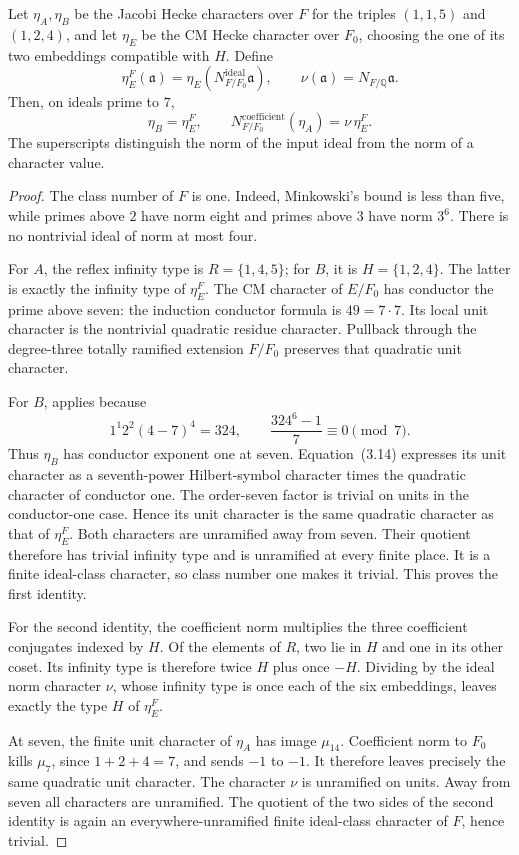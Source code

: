 \begin{lemma}
\label{lem:lm-septic-cm-comparison}
Let $\eta_A,\eta_B$ be the Jacobi Hecke characters over
$F$ for the triples $(1,1,5)$ and $(1,2,4)$, and let
$\eta_E$ be the CM Hecke character over $F_0$, choosing
the one of its two embeddings compatible with $H$.
Define
\[
 \eta_E^F(\mathfrak a)=
 \eta_E(N_{F/F_0}^{\mathrm{ideal}}\mathfrak a),\qquad
 \nu(\mathfrak a)=N_{F/\mathbb Q}\mathfrak a.
\]
Then, on ideals prime to $7$,
\[
 \eta_B=\eta_E^F,\qquad
 N_{F/F_0}^{\mathrm{coefficient}}(\eta_A)
       =\nu\,\eta_E^F.
 \tag{$\dagger$}\label{eq:lm-septic-character-identities}
\]
The superscripts distinguish the norm of the input ideal
from the norm of a character value.
\end{lemma}
\begin{proof}
The class number of $F$ is one.  Indeed, Minkowski's
bound is less than five, while primes above $2$ have
norm eight and primes above $3$ have norm $3^6$.
There is no nontrivial ideal of norm at most four.

For $A$, the reflex infinity type is
$R=\{1,4,5\}$; for $B$, it is $H=\{1,2,4\}$.
The latter is exactly the infinity type of $\eta_E^F$.
The CM character of $E/F_0$ has conductor the prime
above seven: the induction conductor formula is
$49=7\cdot7$.
Its local unit character is the nontrivial quadratic
residue character.  Pullback through the degree-three
totally ramified extension $F/F_0$ preserves that
quadratic unit character.

For $B$, \citet[Proposition~3.12(1), author p.~16]{ShuExpanded2021} applies because
\[
 1^1 2^2(4-7)^4=324,\qquad
 \frac{324^6-1}{7}\equiv0\pmod7.
\]
Thus $\eta_B$ has conductor exponent one at seven.
Equation~(3.14) expresses its unit character as a
seventh-power Hilbert-symbol character times the
quadratic character of conductor one.
The order-seven factor is trivial on units in the
conductor-one case.  Hence its unit character is
the same quadratic character as that of $\eta_E^F$.
Both characters are unramified away from seven.
Their quotient therefore has trivial infinity type
and is unramified at every finite place.  It is a
finite ideal-class character, so class number one
makes it trivial.  This proves the first identity.

For the second identity, the coefficient norm
multiplies the three coefficient conjugates indexed
by $H$.  Of the elements of $R$, two lie in $H$ and
one in its other coset.  Its infinity type is
therefore twice $H$ plus once $-H$.
Dividing by the ideal norm character $\nu$, whose
infinity type is once each of the six embeddings,
leaves exactly the type $H$ of $\eta_E^F$.

At seven, the finite unit character of $\eta_A$
has image $\mu_{14}$.  Coefficient norm to $F_0$
kills $\mu_7$, since $1+2+4=7$, and sends $-1$
to $-1$.  It therefore leaves precisely the same
quadratic unit character.  The character $\nu$ is
unramified on units.  Away from seven all characters
are unramified.  The quotient of the two sides of
the second identity is again an everywhere-unramified
finite ideal-class character of $F$, hence trivial.
\end{proof}

